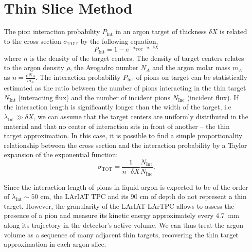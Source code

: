 \documentclass[aps,prl,twocolumn,showpacs,superscriptaddress,groupedaddress]{revtex4}  %
\begin{document}
\section{\label{sec:ThinSliceMethod}Thin Slice Method}
The pion interaction probability $P_{\text{Int}}$ in an argon target of thickness $\delta X$  is related to the cross section $\sigma_{\text{TOT}}$ by the following equation, 
\begin{equation}
P_{\text{Int}} = 1- e^{-\sigma_{\text{TOT}}\text{ } n \text{ }\delta X}
\label{eq:thinTargetXS}
\end{equation}
where $n$ is the density of the target centers. The density of target centers relates to the argon density $\rho$, the Avogadro number  $ N_{A} $ and the argon molar mass $m_A$ as $n=\frac{\rho N_{A} }{m_A}$.  The interaction probability $P_{\text{Int}}$ of pions on target can be statistically estimated as the ratio between the number of pions interacting in the thin target $N_{\text{Int}}$ (interacting flux) and the number of incident pions $N_{\text{Inc}}$ (incident flux). 
If the interaction length is significantly longer than the width of the target, i.e $\lambda_{\text{Int}} \gg \delta X$, we can assume that the target centers are uniformly distributed in the material and that no center of interaction sits in front of another -- the thin target approximation. In this case, it is possible to find a simple proportionality relationship between the cross section and the interaction probability by a Taylor expansion of the exponential function:
 \begin{equation}
 \sigma_{\text{TOT}}  = \frac{1}{n \text{ }\delta X}\frac{N_{\text{Int}}}{N_{\text{Inc}}}.
\label{eq:thinTargetXSSolved}
\end{equation}


Since the interaction length of pions in liquid argon is  expected  to be of the order of $\lambda_{\text{Int}} \sim 50$ cm, the LArIAT TPC and its 90 cm of depth do not represent a thin target. However, the granularity of the LArIAT LArTPC allows to assess the presence of a pion and measure its kinetic energy approximately every 4.7~mm along its trajectory in the detector's active volume. We can thus treat the argon volume as a sequence of many adjacent thin targets, recovering the thin target approximation in each argon slice. 
\end{document}

